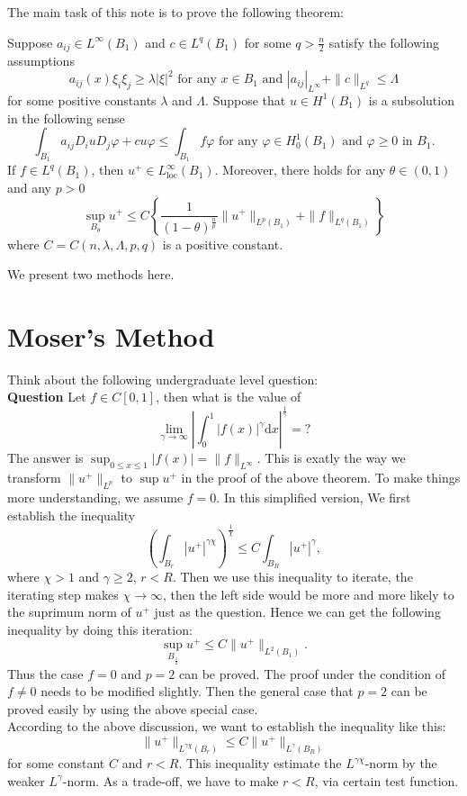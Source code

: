 The main task of this note is to prove the following theorem:
\begin{theorem}
 Suppose $a_{ij}\in L^{\infty}(B_1)$ and $c\in L^{q}(B_1)$ for some $q>\frac{n}{2}$ satisfy the following assumptions
  \[
    a_{ij}(x)\xi_i\xi_j\ge \lambda \left| \xi \right| ^{2}\text{ for any }x\in B_1 \text{ and }\left| a_{ij} \right| _{L^{\infty}}+\|c\|_{L^{q}}\le \Lambda
  \] 
  for some positive constants $\lambda$ and $\Lambda$. Suppose that  $u\in H^{1}(B_1)$ is a subsolution in the following sense
  \[
    \int_{B_1}a_{ij}D_iuD_j\varphi+cu\varphi\le \int_{B_1}f\varphi \text{ for any }\varphi \in H_0^{1}(B_1) \text{ and } \varphi\ge 0 \text{ in }B_1.
  \] 
  If $f\in L^{q}(B_1)$, then $u^{+}\in L_{\mathrm{loc}}^{\infty}(B_1)$. Moreover, there holds for any $\theta \in  (0,1)$ and any $p>0$ 
  \[
    \sup_{B_{\theta}}u^{+}\le C\left\lbrace \frac{1}{(1-\theta)^{\frac{n}{p}}}\|u^{+}\|_{L^{p}(B_1)}+\|f\|_{L^{q}(B_1)}  \right\rbrace
  \]
  where $C=C(n,\lambda,\Lambda,p,q)$ is a positive constant.
\end{theorem}
We present two methods here.
\section{Moser's Method}
Think about the following undergraduate level question:\\
{\textbf{Question}} Let $f\in C[0,1]$, then what is the value of 
  \[
    \lim_{\gamma \to \infty}\left|\int_0^1 \left| f(x) \right|^{\gamma}\mathrm{d}x\right|^{\frac{1}{\gamma}}=?
  \]
  The answer is $\sup_{0\le x\le 1}\left| f(x) \right|=\|f\|_{L^{\infty}}$.
This is exatly the way we transform  $\|u^{+}\|_{L^{p}}$ to  $\sup u^{+}$ in the proof of the  above theorem. To make things more understanding, we assume $f=0$. In this simplified version, We first establish the inequality
   \[
     \left( \int_{B_r}\left| u^{+} \right| ^{\gamma\chi} \right)^{\frac{1}{\chi}}\le C\int_{B_R}\left| u^{+} \right|^{\gamma},  
   \]  
   where $\chi>1$ and $\gamma\ge 2$, $r<R$. Then we use this inequality to iterate, the iterating step makes  $\chi\to \infty$, then the left side would be more and more likely to the suprimum norm of $u^{+}$ just as the question. Hence we can get the following inequality by doing this iteration:
   \[
     \sup_{B_{\frac{1}{2}}}u^{+}\le C \|u^{+}\|_{L^{2}(B_1)} .
   \] 
Thus the case $f=0$ and $p=2$ can be proved. The proof under the  condition of $f\neq 0$ needs to be modified slightly.
Then the general case that $p= 2$ can be proved easily by using the above special case.\\
According to the above discussion, we want to establish the inequality like this: 
\[
  \|u^{+}\|_{L^{\gamma\chi}(B_r)}\le C\|u^{+}\|_{L^{\gamma}(B_R)}
\] 
for some constant $C$ and $r<R$. This inequality estimate the  $L^{\gamma\chi}$-norm by the weaker $L^{\gamma}$-norm. As a trade-off, we have to make $r<R$, via certain test function. 

